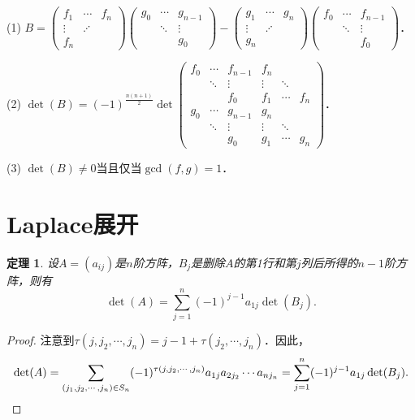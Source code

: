 \documentclass[a4paper,fontset=windows]{ctexbook}
\newtheorem{theorem}{定理}[chapter]
\theoremstyle{definition}
\begin{document}
\begin{enumerate}
(1) $B=\begin{pmatrix}f_1&\cdots&f_n \\ \vdots&\iddots& \\ f_n\end{pmatrix}\begin{pmatrix}g_0&\cdots&g_{n-1} \\ &\ddots&\vdots \\ &&g_0\end{pmatrix}-\begin{pmatrix}g_1&\cdots&g_n \\ \vdots&\iddots& \\ g_n\end{pmatrix}\begin{pmatrix}f_0&\cdots&f_{n-1} \\ &\ddots&\vdots \\ &&f_0\end{pmatrix}$．

(2) $\det(B)=(-1)^{\frac{n(n+1)}{2}}\det\begin{pmatrix}f_0&\cdots&f_{n-1}&f_n&& \\ &\ddots&\vdots&\vdots&\ddots& \\ &&f_0&f_1&\cdots&f_n \\ g_0&\cdots&g_{n-1}&g_n&& \\ &\ddots&\vdots&\vdots&\ddots& \\ &&g_0&g_1&\cdots&g_n\end{pmatrix}$．

(3) $\det(B)\ne 0$当且仅当$\gcd(f,g)=1$．

\end{enumerate}

\clearpage\section{ Laplace展开}

\begin{theorem}\label{thm3.7}
设$A=(a_{ij})$是$n$阶方阵，$B_j$是删除$A$的第1行和第$j$列后所得的$n-1$阶方阵，则有
\begin{equation}\label{eq3.2}
\det(A)=\sum_{j=1}^n(-1)^{j-1}a_{1j}\det(B_j).
\end{equation}
\end{theorem}

\begin{proof}
注意到$\tau(j,j_2,\cdots,j_n)=j-1+\tau(j_2,\cdots,j_n)$．因此，
\begin{equation*}
\det(A)=\sum_{(j_1,j_2,\cdots,j_n)\in S_n}(-1)^{\tau(j,j_2,\cdots,j_n)}a_{1j}a_{2j_2}\cdots a_{nj_n}=\sum_{j=1}^n(-1)^{j-1}a_{1j}\det(B_j).\qedhere
\end{equation*}
\end{proof}
\end{document}
